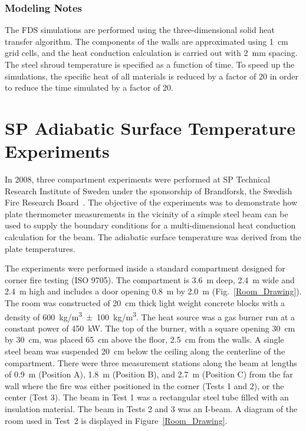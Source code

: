 \subsubsection{Modeling Notes}

The FDS simulations are performed using the three-dimensional solid heat transfer algorithm. The components of the walls are approximated using 1~cm grid cells, and the heat conduction calculation is carried out with 2~mm spacing. The steel shroud temperature is specified as a function of time. To speed up the simulations, the specific heat of all materials is reduced by a factor of 20 in order to reduce the time simulated by a factor of 20. 



\section{SP Adiabatic Surface Temperature Experiments}
\label{SP_AST_Description}

In 2008, three compartment experiments were performed at SP Technical Research Institute of Sweden under the sponsorship of Brandforsk, the Swedish Fire Research Board~\cite{Wickstrom_AST}. The objective of the experiments was to demonstrate how plate thermometer measurements in the vicinity of a simple steel beam can be used to supply the boundary conditions for a multi-dimensional heat conduction calculation for the beam. The adiabatic surface temperature was derived from the plate temperatures.

The experiments were performed inside a standard compartment designed for corner fire testing (ISO 9705). The compartment is 3.6~m deep, 2.4~m wide and 2.4~m high and includes a door opening 0.8~m by 2.0~m (Fig.~\ref{Room_Drawing}). The room was constructed of 20~cm thick light weight concrete blocks with a density of 600~\unit{kg/m^3}~$\pm$~100~\unit{kg/m^3}. The heat source was a gas burner run at a constant power of 450~kW. The top of the burner, with a square opening 30~cm by 30~cm, was placed 65~cm above the floor, 2.5~cm from the walls. A single steel beam was suspended 20~cm below the ceiling along the centerline of the compartment. There were three measurement stations along the beam at lengths of 0.9~m (Position A), 1.8~m (Position B), and 2.7~m (Position C) from the far wall where the fire was either positioned in the corner (Tests 1 and 2), or the center (Test 3). The beam in Test 1 was a rectangular steel tube filled with an insulation material. The beam in Tests 2 and 3 was an I-beam. A diagram of the room used in Test~2 is displayed in Figure~\ref{Room_Drawing}.

